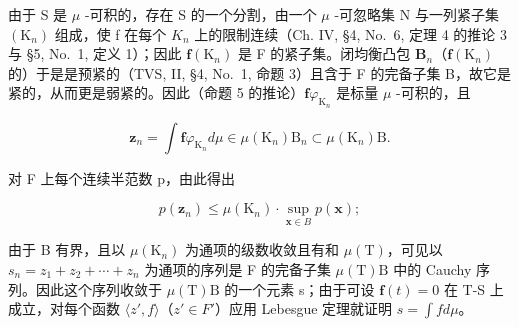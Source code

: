 由于 S 是 \(\mu\) -可积的，存在 S 的一个分割，由一个 \(\mu\) -可忽略集 N 与一列紧子集 \((\mathrm{K}_{n})\) 组成，使 f 在每个 \(K_{n}\) 上的限制连续（Ch. IV, §4, No.~6, 定理 4 的推论 3 与 §5, No.~1, 定义 1）；因此 \(\mathbf{f}(\mathrm{K}_n)\) 是 F 的紧子集。闭均衡凸包 \(\mathbf{B}_n\)（\(\mathbf{f}(\mathrm{K}_n)\) 的）于是是预紧的（TVS, II, §4, No.~1, 命题 3）且含于 F 的完备子集 B，故它是紧的，从而更是弱紧的。因此（命题 5 的推论）\(\mathbf{f}\varphi_{\mathrm{K}_n}\) 是标量 \(\mu\) -可积的，且

\[
\mathbf {z} _ {n} = \int \mathbf {f} \varphi_ {\mathrm{K} _ {n}} d \mu \in \mu (\mathrm{K} _ {n}) \mathrm{B} _ {n} \subset \mu (\mathrm{K} _ {n}) \mathrm{B}.
\]

对 F 上每个连续半范数 p，由此得出

\[
p (\mathbf {z} _ {n}) \leqslant \mu (\mathrm{K} _ {n}) \cdot \sup _ {\mathbf {x} \in B} p (\mathbf {x});
\]

由于 B 有界，且以 \(\mu(\mathrm{K}_{n})\) 为通项的级数收敛且有和 \(\mu(\mathrm{T})\)，可见以 \(s_{n}=z_{1}+z_{2}+\cdots+z_{n}\) 为通项的序列是 F 的完备子集 \(\mu(\mathrm{T})\mathrm{B}\) 中的 Cauchy 序列。因此这个序列收敛于 \(\mu(\mathrm{T})\mathrm{B}\) 的一个元素 s；由于可设 \(\mathbf{f}(t)=0\) 在 T-S 上成立，对每个函数 \(\langle z', f\rangle\)（\(z'\in F'\)）应用 Lebesgue 定理就证明 \(s=\int f d\mu\)。
\relax{}
